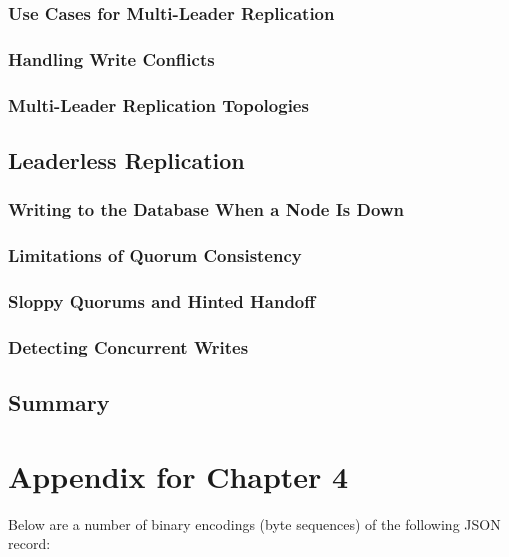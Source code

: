 \documentclass[12pt, titlepage]{article}
\begin{document}
\subsubsection{Use Cases for Multi-Leader Replication}

\subsubsection{Handling Write Conflicts}

\subsubsection{Multi-Leader Replication Topologies}

\subsection{Leaderless Replication}

\subsubsection{Writing to the Database When a Node Is Down}

\subsubsection{Limitations of Quorum Consistency}

\subsubsection{Sloppy Quorums and Hinted Handoff}

\subsubsection{Detecting Concurrent Writes}

\subsection{Summary}

\newpage
\appendix

\section{Appendix for Chapter 4}

Below are a number of binary encodings (byte sequences) of the following JSON record:
\end{document}
